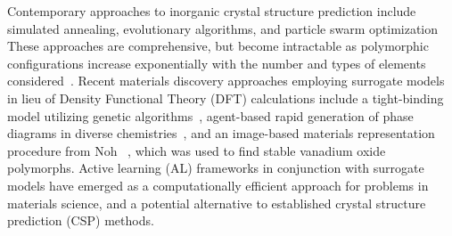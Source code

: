 %
%
%
Contemporary approaches to inorganic crystal structure prediction %
include simulated annealing, evolutionary algorithms, and particle swarm optimization
\cite{Oganov2006,Lyakhov2010,Glass2006,Wang2012,Pickard2011,Pickard2006,Avery2019,Lonie2011}
%
These approaches are comprehensive, but become intractable as  %
polymorphic configurations increase exponentially with the number and types of elements considered~\cite{Stillinger1999}.
%
%
%
Recent materials discovery approaches employing surrogate models in lieu of Density Functional Theory (DFT) calculations include a tight-binding model utilizing genetic algorithms~\cite{VanDenBossche2018},
agent-based rapid generation of phase diagrams in diverse chemistries~\cite{Montoya2020},
and an image-based materials representation procedure from Noh ~\cite{noh2019inverse},
which was used to find stable vanadium oxide polymorphs.
%
Active learning (AL) frameworks in conjunction with surrogate models have emerged as a computationally efficient approach for problems in materials science, and a potential alternative to established crystal structure prediction (CSP) methods.
\cite{hansen2019atomistic,torres2019low,Jennings2019,podryabinkin2017active,Bassman2018}
%

